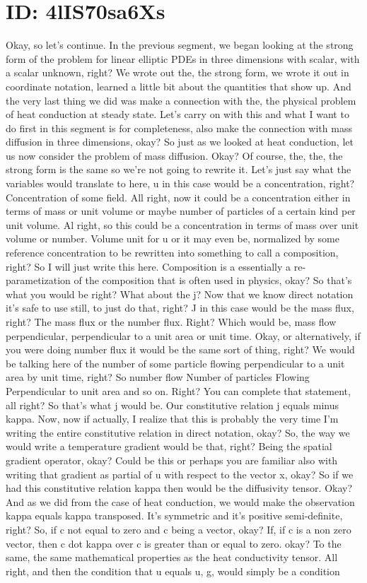 \documentclass[10pt]{article}
\begin{document}
\section*{ID: 4lIS70sa6Xs}
Okay, so let's continue. In the previous segment, we began looking at the strong form of the problem for linear elliptic PDEs in three dimensions with scalar, with a scalar unknown, right? We wrote out the, the strong form, we wrote it out in coordinate notation, learned a little bit about the quantities that show up. And the very last thing we did was make a connection with the, the physical problem of heat conduction at steady state. Let's carry on with this and what I want to do first in this segment is for completeness, also make the connection with mass diffusion in three dimensions, okay? So just as we looked at heat conduction, let us now consider the problem of mass diffusion. Okay? Of course, the, the, the strong form is the same so we're not going to rewrite it. Let's just say what the variables would translate to here, u in this case would be a concentration, right? Concentration of some field. All right, now it could be a concentration either in terms of mass or unit volume or maybe number of particles of a certain kind per unit volume. Al right, so this could be a concentration in terms of mass over unit volume or number. Volume unit for u or it may even be, normalized by some reference concentration to be rewritten into something to call a composition, right? So I will just write this here. Composition is a essentially a re-parametization of the composition that is often used in physics, okay? So that's what you would be right? What about the j? Now that we know direct notation it's safe to use still, to just do that, right? J in this case would be the mass flux, right? The mass flux or the number flux. Right? Which would be, mass flow perpendicular, perpendicular to a unit area or unit time. Okay, or alternatively, if you were doing number flux it would be the same sort of thing, right? We would be talking here of the number of some particle flowing perpendicular to a unit area by unit time, right? So number flow Number of particles Flowing Perpendicular to unit area and so on. Right? You can complete that statement, all right? So that's what j would be. Our constitutive relation j equals minus kappa. Now, now if actually, I realize that this is probably the very time I'm writing the entire constitutive relation in direct notation, okay? So, the way we would write a temperature gradient would be that, right? Being the spatial gradient operator, okay? Could be this or perhaps you are familiar also with writing that gradient as partial of u with respect to the vector x, okay? So if we had this constitutive relation kappa then would be the diffusivity tensor. Okay? And as we did from the case of heat conduction, we would make the observation kappa equals kappa transposed. It's symmetric and it's positive semi-definite, right? So, if c not equal to zero and c being a vector, okay? If, if c is a non zero vector, then c dot kappa over c is greater than or equal to zero. okay? To the same, the same mathematical properties as the heat conductivity tensor. All right, and then the condition that u equals u, g, would simply be a condition 
\end{document}
